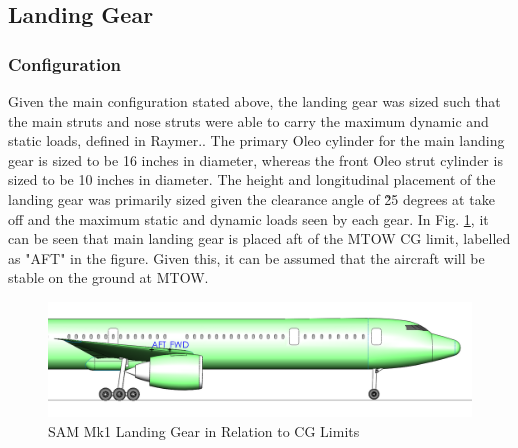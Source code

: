 \subsection{Landing Gear}
\label{section: Landing Gear}
\subsubsection{Configuration}

Given the main configuration stated above, the landing gear was sized such that the main struts and nose struts were able to carry the maximum dynamic and static loads, defined in Raymer.\cite{raymer}. The primary Oleo cylinder for the main landing gear is sized to be 16 inches in diameter, whereas the front Oleo strut cylinder is sized to be 10 inches in diameter. The height and longitudinal placement of the landing gear was primarily sized given the clearance angle of \~25 degrees at take off and the maximum static and dynamic loads seen by each gear. \cite{raymer} In Fig. \ref{fig:landing_gear_CG}, it can be seen that main landing gear is placed aft of the MTOW CG limit, labelled as "AFT" in the figure. Given this, it can be assumed that the aircraft will be stable on the ground at MTOW.

\begin{figure}[!h]
    \centering
    \includegraphics[width=\linewidth]{Photos/landinggear/LG Close Side View with CG.PNG}
    \caption{SAM Mk1 Landing Gear in Relation to CG Limits}
    \label{fig:landing_gear_CG}
\end{figure}


